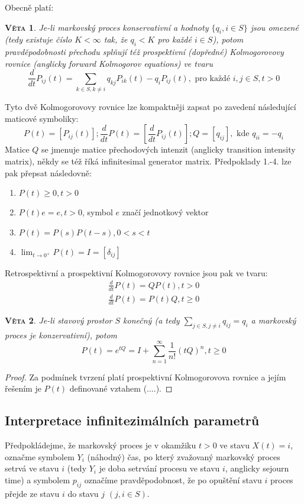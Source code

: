 \documentclass[10pt]{article}
\newtheorem{proposition}{\textsc{Věta}}
\begin{document}
Obecně platí:
\begin{proposition}
Je-li markovský proces konservativní a hodnoty $\{q_i,i \in S\}$ jsou omezené (tedy existuje číslo $K < \infty$ tak, že $q_i<K$ pro každé $i \in S$), potom pravděpodobnosti přechodu splňují též prospektivní (dopředné) Kolmogorovovy rovnice (anglicky forward Kolmogorov equations) ve tvaru
\begin{equation}
\frac{d}{dt}P_{ij}(t) = \sum_{k \in S, k \neq i} q_{kj}P_{ik}(t)-q_iP_{ij}(t), \text{ pro každé }i,j \in S, t>0
\end{equation}
\end{proposition}

Tyto dvě Kolmogorovovy rovnice lze kompaktněji zapsat po zavedení následující maticové symboliky:
$$
P(t) = [P_{ij}(t)]; \frac{d}{dt}P(t) = [\frac{d}{dt}P_{ij}(t)];Q=[q_{ij}], \text{ kde }q_{ii}=-q_i
$$
Matice $Q$ se jmenuje matice přechodových intenzit (anglicky transition intensity matrix), někdy se též říká infinitesimal generator matrix. Předpoklady 1.-4. lze pak přepsat následovně:
\begin{enumerate}
\item[1'.] $P(t) \geq 0, t>0$
\item[2'.] $P(t)e = e, t>0$, symbol $e$ značí jednotkový vektor
\item[3'.] $P(t) = P(s)P(t-s), 0<s<t$
\item[4'.] $\lim_{t \to 0^+} P(t) = I = [\delta_{ij}]$
\end{enumerate}
Retrospektivní a prospektivní Kolmogorovovy rovnice jsou pak ve tvaru:
\begin{gather}
\label{eq:retrospectiveKol}
\frac{d}{dt}P(t) = QP(t), t>0\\
\label{eq:forwardspectiveKol}
\frac{d}{dt}P(t) = P(t)Q, t \geq 0
\end{gather}

\begin{proposition}
Je-li stavový prostor $S$ konečný (a tedy $\sum_{j \in S,j \neq i}q_{ij}=q_i$ a markovský proces je konzervativní), potom 
\begin{equation}
P(t) = e^{tQ} = I + \sum_{n=1}^\infty \frac{1}{n!}(tQ)^n, t \geq 0
\end{equation}
\end{proposition}
\begin{proof}
Za podmínek tvrzení platí prospektivní Kolmogorovova rovnice a jejím řešením je $P(t)$ definované vztahem (....).
\end{proof}
\subsection{Interpretace infinitezimálních parametrů}
Předpokládejme, že markovský proces je v okamžiku $t>0$ ve stavu $X(t)=i$, označme symbolem $Y_i$ (náhodný) čas, po který zvažovaný markovský proces setrvá ve stavu $i$ (tedy $Y_i$ je doba setrvání procesu ve stavu $i$, anglicky sejourn time) a symbolem $p_{ij}$ označíme pravděpodobnost, že po opuštění stavu $i$ proces přejde ze stavu $i$ do stavu $j$ $(j,i \in S)$.
\end{document}

